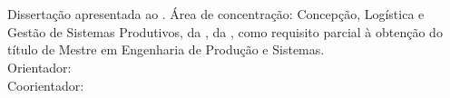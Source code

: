 \begin{center}
    {\singlespacing
    \MakeUppercase{\textbf{\aluno}} \\ [5cm]

    \MakeUppercase{\titulo} \\ [1cm]
    
    \hspace{.45\textwidth} %
        \begin{minipage}{.5\textwidth}
        \noindent Dissertação apresentada ao \curso. Área de concentração: Concepção, Logística e Gestão de Sistemas Produtivos, da \departamento, da \universidade, como requisito parcial à obtenção do título de Mestre em Engenharia de Produção e Sistemas. \\ [5mm]
        \noindent Orientador: \orientador \\
        \noindent Coorientador: \coorientador
        \end{minipage}
    
    \vfill
    
    \MakeUppercase{\cidade} \\ 
    \ano}
\end{center}